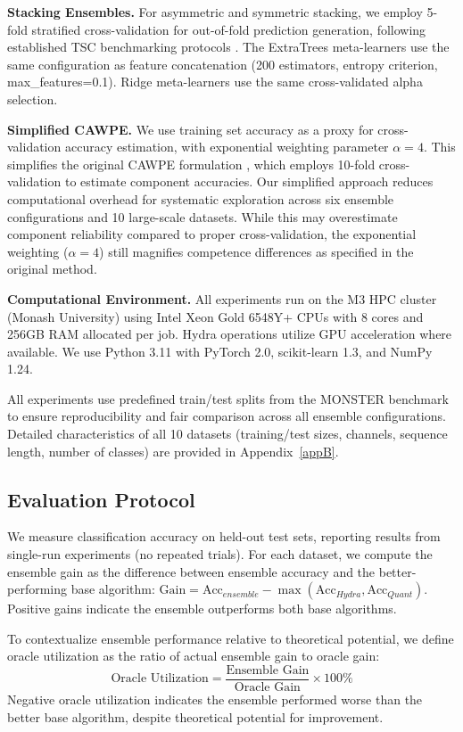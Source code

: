 \documentclass[pdflatex,sn-basic]{sn-jnl}           %
\theoremstyle{thmstyleone}%
\theoremstyle{thmstyletwo}%
\theoremstyle{thmstylethree}%
\begin{document}
\textbf{Stacking Ensembles.} For asymmetric and symmetric stacking, we employ 5-fold stratified cross-validation for out-of-fold prediction generation, following established TSC benchmarking protocols \citep{tsc-bakeoff}. The ExtraTrees meta-learners use the same configuration as feature concatenation (200 estimators, entropy criterion, max\_features=0.1). Ridge meta-learners use the same cross-validated alpha selection.

\textbf{Simplified CAWPE.} We use training set accuracy as a proxy for cross-validation accuracy estimation, with exponential weighting parameter $\alpha=4$. This simplifies the original CAWPE formulation \citep{cawpe}, which employs 10-fold cross-validation to estimate component accuracies. Our simplified approach reduces computational overhead for systematic exploration across six ensemble configurations and 10 large-scale datasets. While this may overestimate component reliability compared to proper cross-validation, the exponential weighting ($\alpha=4$) still magnifies competence differences as specified in the original method.

\textbf{Computational Environment.} All experiments run on the M3 HPC cluster (Monash University) using Intel Xeon Gold 6548Y+ CPUs with 8 cores and 256GB RAM allocated per job. Hydra operations utilize GPU acceleration where available. We use Python 3.11 with PyTorch 2.0, scikit-learn 1.3, and NumPy 1.24.

All experiments use predefined train/test splits from the MONSTER benchmark to ensure reproducibility and fair comparison across all ensemble configurations. Detailed characteristics of all 10 datasets (training/test sizes, channels, sequence length, number of classes) are provided in Appendix~\ref{appB}.

\subsection{Evaluation Protocol}

We measure classification accuracy on held-out test sets, reporting results from single-run experiments (no repeated trials). For each dataset, we compute the ensemble gain as the difference between ensemble accuracy and the better-performing base algorithm: $\text{Gain} = \text{Acc}_{ensemble} - \max(\text{Acc}_{Hydra}, \text{Acc}_{Quant})$. Positive gains indicate the ensemble outperforms both base algorithms.

To contextualize ensemble performance relative to theoretical potential, we define oracle utilization as the ratio of actual ensemble gain to oracle gain:
\begin{equation}
\text{Oracle Utilization} = \frac{\text{Ensemble Gain}}{\text{Oracle Gain}} \times 100\%
\end{equation}
Negative oracle utilization indicates the ensemble performed worse than the better base algorithm, despite theoretical potential for improvement.
\end{document}
